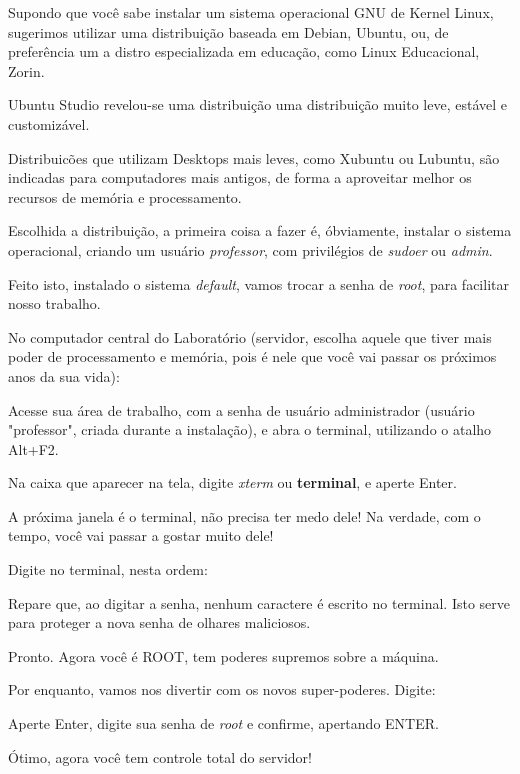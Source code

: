 

\begin{multicols}{2}
	\normalsize
	
	Supondo que você sabe instalar um sistema operacional GNU de Kernel Linux, sugerimos utilizar uma distribuição baseada em Debian, Ubuntu, ou, de preferência um a distro especializada em educação, como Linux Educacional, Zorin.
	
	Ubuntu Studio revelou-se uma distribuição uma distribuição muito leve, estável e customizável.
	
	Distribuicões que utilizam Desktops mais leves, como Xubuntu ou Lubuntu, são indicadas para computadores mais antigos, de forma a aproveitar melhor os recursos de memória e processamento.
	
	Escolhida a distribuição, a primeira coisa a fazer é, óbviamente, instalar o sistema operacional, criando um usuário \textit{professor}, com privilégios de \textit{sudoer} ou \textit{admin}.
	
	Feito isto, instalado o sistema \textit{default}, vamos trocar a senha de \textit{root}, para facilitar nosso trabalho.
	
	No computador central do Laboratório (servidor, escolha aquele que tiver mais poder de processamento e memória, pois é nele que você vai passar os próximos anos da sua vida):
	
	Acesse sua área de trabalho, com a senha de usuário administrador (usuário "professor", criada durante a instalação), e abra o terminal, utilizando o atalho Alt+F2.
	
	Na caixa que aparecer na tela, digite \textit{xterm} ou \textbf{terminal}, e aperte Enter.
	
	A próxima janela é o terminal, não precisa ter medo dele! Na verdade, com o tempo, você vai passar a gostar muito dele!
	
	Digite no terminal, nesta ordem:



	Repare que, ao digitar a senha, nenhum caractere é escrito no terminal. Isto serve para proteger a nova senha de olhares maliciosos.
	
	Pronto. Agora você é ROOT, tem poderes supremos sobre a máquina.
	
	Por enquanto, vamos nos divertir com os novos super-poderes. Digite:
	
	
	Aperte Enter, digite sua senha de \textit{root} e confirme, apertando ENTER.
	
	Ótimo, agora você tem controle total do servidor!
	

\end{multicols}
